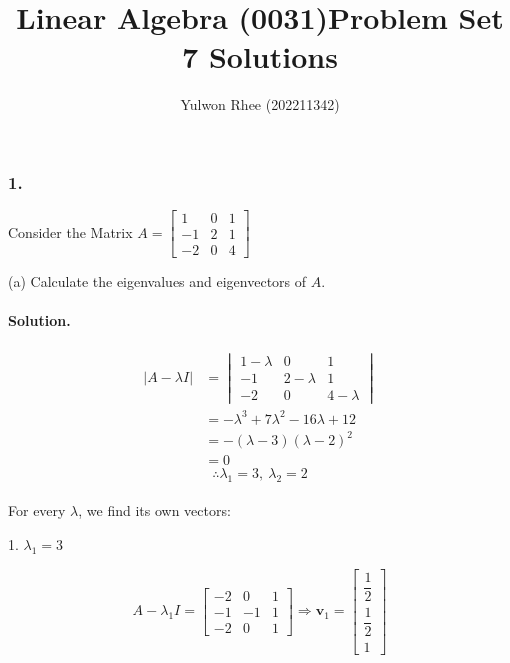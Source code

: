 



\title{Linear Algebra (0031)\newline\space Problem Set 7 Solutions}
\author{Yulwon Rhee (202211342)}

\maketitle
\subsubsection{1.} Consider the Matrix $A = \begin{bmatrix}
    1&0&1\\
    -1&2&1\\
    -2&0&4
\end{bmatrix}$

(a) Calculate the eigenvalues and eigenvectors of $A$.
\paragraph*{Solution.}
\begin{align*}
    |A-\lambda I| &= \begin{vmatrix}
        1-\lambda&0&1\\
        -1&2-\lambda&1\\
        -2&0&4-\lambda
    \end{vmatrix}\\
    &= -\lambda^3 + 7\lambda^2-16\lambda+12\\
    &= -(\lambda - 3)(\lambda - 2)^2\\
    &= 0
\end{align*}
$$\therefore \lambda_1 = 3,\ \lambda_2 = 2$$\\
For every $\lambda$, we find its own vectors:

1. $\lambda_1 = 3$

$$A - \lambda_1 I = \begin{bmatrix}
    -2&0&1\\-1&-1&1\\-2&0&1
\end{bmatrix} \Rightarrow \mathbf{v}_1=\begin{bmatrix}
    \dfrac{1}{2}\\[0.3cm]
    \dfrac{1}{2}\\[0.3cm]
    1
\end{bmatrix}$$

